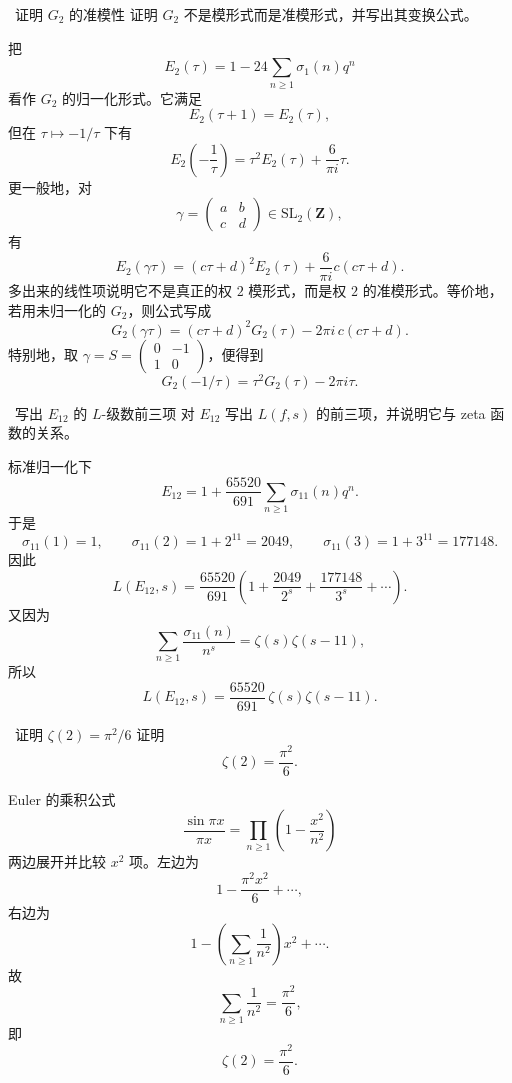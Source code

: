 \begin{problem}{\easy\ 证明 $G_2$ 的准模性}
证明 $G_2$ 不是模形式而是准模形式，并写出其变换公式。
\end{problem}
\begin{solution}
把
\[
E_2(\tau)=1-24\sum_{n\ge1}\sigma_1(n)q^n
\]
看作 $G_2$ 的归一化形式。它满足
\[
E_2(\tau+1)=E_2(\tau),
\]
但在 $\tau\mapsto -1/\tau$ 下有
\[
E_2\!\left(-\frac1\tau\right)=\tau^2E_2(\tau)+\frac{6}{\pi i}\tau.
\]
更一般地，对
\[
\gamma=\begin{pmatrix}a&b\\ c&d\end{pmatrix}\in \mathrm{SL}_2(\mathbf Z),
\]
有
\[
E_2(\gamma\tau)=(c\tau+d)^2E_2(\tau)+\frac{6}{\pi i}c(c\tau+d).
\]
多出来的线性项说明它不是真正的权 $2$ 模形式，而是权 $2$ 的准模形式。等价地，若用未归一化的 $G_2$，则公式写成
\[
G_2(\gamma\tau)=(c\tau+d)^2G_2(\tau)-2\pi i\,c(c\tau+d).
\]
特别地，取 $\gamma=S=\begin{pmatrix}0&-1\\1&0\end{pmatrix}$，便得到
\[
G_2(-1/\tau)=\tau^2G_2(\tau)-2\pi i\tau.
\]
\end{solution}

\begin{problem}{\easy\ 写出 $E_{12}$ 的 $L$-级数前三项}
对 $E_{12}$ 写出 $L(f,s)$ 的前三项，并说明它与 zeta 函数的关系。
\end{problem}
\begin{solution}
标准归一化下
\[
E_{12}=1+\frac{65520}{691}\sum_{n\ge1}\sigma_{11}(n)q^n.
\]
于是
\[
\sigma_{11}(1)=1,\qquad
\sigma_{11}(2)=1+2^{11}=2049,\qquad
\sigma_{11}(3)=1+3^{11}=177148.
\]
因此
\[
L(E_{12},s)=\frac{65520}{691}\left(1+\frac{2049}{2^s}+\frac{177148}{3^s}+\cdots\right).
\]
又因为
\[
\sum_{n\ge1}\frac{\sigma_{11}(n)}{n^s}=\zeta(s)\zeta(s-11),
\]
所以
\[
L(E_{12},s)=\frac{65520}{691}\,\zeta(s)\zeta(s-11).
\]
\end{solution}

\begin{problem}{\easy\ 证明 $\zeta(2)=\pi^2/6$}
证明
\[
\zeta(2)=\frac{\pi^2}{6}.
\]
\end{problem}
\begin{solution}
Euler 的乘积公式
\[
\frac{\sin \pi x}{\pi x}=\prod_{n\ge1}\left(1-\frac{x^2}{n^2}\right)
\]
两边展开并比较 $x^2$ 项。左边为
\[
1-\frac{\pi^2x^2}{6}+\cdots,
\]
右边为
\[
1-\left(\sum_{n\ge1}\frac1{n^2}\right)x^2+\cdots.
\]
故
\[
\sum_{n\ge1}\frac1{n^2}=\frac{\pi^2}{6},
\]
即
\[
\zeta(2)=\frac{\pi^2}{6}.
\]
\end{solution}

